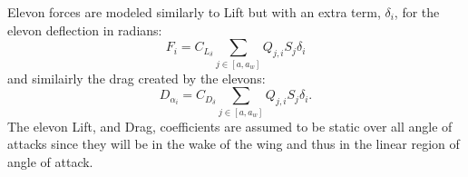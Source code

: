 Elevon forces are modeled similarly to Lift but with an extra term, $\delta_i$, for the elevon deflection in radians:\cite{nelson}
\begin{equation}
    F_i = C_{L_\delta} \sum_{j \in [a, a_w]}  Q_{j,i} S_j \delta_i
\end{equation}
and similairly the drag created by the elevons:
\begin{equation}
    D_{\alpha_i} = C_{D_\delta} \sum_{j \in [a, a_w]}  Q_{j,i} S_j \delta_i .
\end{equation}
The elevon Lift, and Drag, coefficients are assumed to be static over all angle of attacks since they will be in the wake of the wing and thus in the linear region of angle of attack.
